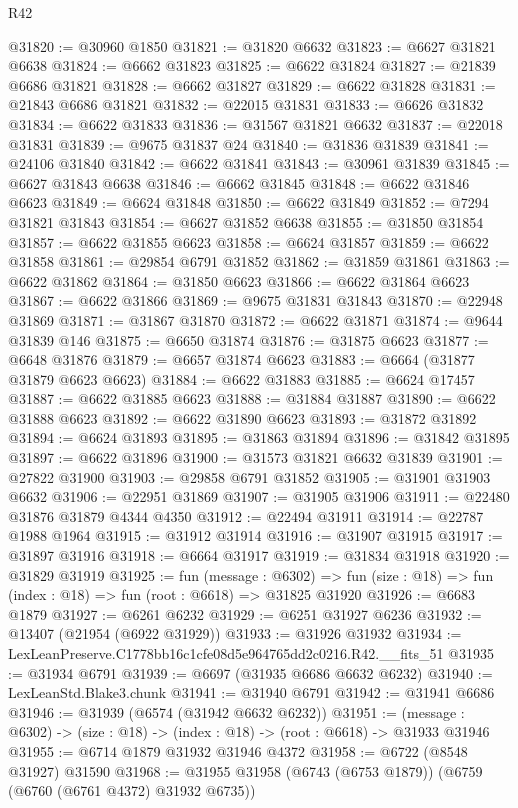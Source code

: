 \begin{lexlean}{R42}
\begin{coremodule}
{@31820 := @30960 @1850
@31821 := @31820 @6632
@31823 := @6627 @31821 @6638
@31824 := @6662 @31823
@31825 := @6622 @31824
@31827 := @21839 @6686 @31821
@31828 := @6662 @31827
@31829 := @6622 @31828
@31831 := @21843 @6686 @31821
@31832 := @22015 @31831
@31833 := @6626 @31832
@31834 := @6622 @31833
@31836 := @31567 @31821 @6632
@31837 := @22018 @31831
@31839 := @9675 @31837 @24
@31840 := @31836 @31839
@31841 := @24106 @31840
@31842 := @6622 @31841
@31843 := @30961 @31839
@31845 := @6627 @31843 @6638
@31846 := @6662 @31845
@31848 := @6622 @31846 @6623
@31849 := @6624 @31848
@31850 := @6622 @31849
@31852 := @7294 @31821 @31843
@31854 := @6627 @31852 @6638
@31855 := @31850 @31854
@31857 := @6622 @31855 @6623
@31858 := @6624 @31857
@31859 := @6622 @31858
@31861 := @29854 @6791 @31852
@31862 := @31859 @31861
@31863 := @6622 @31862
@31864 := @31850 @6623
@31866 := @6622 @31864 @6623
@31867 := @6622 @31866
@31869 := @9675 @31831 @31843
@31870 := @22948 @31869
@31871 := @31867 @31870
@31872 := @6622 @31871
@31874 := @9644 @31839 @146
@31875 := @6650 @31874
@31876 := @31875 @6623
@31877 := @6648 @31876
@31879 := @6657 @31874 @6623
@31883 := @6664 (@31877 @31879 @6623 @6623)
@31884 := @6622 @31883
@31885 := @6624 @17457
@31887 := @6622 @31885 @6623
@31888 := @31884 @31887
@31890 := @6622 @31888 @6623
@31892 := @6622 @31890 @6623
@31893 := @31872 @31892
@31894 := @6624 @31893
@31895 := @31863 @31894
@31896 := @31842 @31895
@31897 := @6622 @31896
@31900 := @31573 @31821 @6632 @31839
@31901 := @27822 @31900
@31903 := @29858 @6791 @31852
@31905 := @31901 @31903 @6632
@31906 := @22951 @31869
@31907 := @31905 @31906
@31911 := @22480 @31876 @31879 @4344 @4350
@31912 := @22494 @31911
@31914 := @22787 @1988 @1964
@31915 := @31912 @31914
@31916 := @31907 @31915
@31917 := @31897 @31916
@31918 := @6664 @31917
@31919 := @31834 @31918
@31920 := @31829 @31919
@31925 := fun (message : @6302) =>
  fun (size : @18) => fun (index : @18) => fun (root : @6618) => @31825 @31920
@31926 := @6683 @1879
@31927 := @6261 @6232
@31929 := @6251 @31927 @6236
@31932 := @13407 (@21954 (@6922 @31929))
@31933 := @31926 @31932
@31934 := LexLeanPreserve.C1778bb16c1cfe08d5e964765dd2c0216.R42.__fits_51
@31935 := @31934 @6791
@31939 := @6697 (@31935 @6686 @6632 @6232)
@31940 := LexLeanStd.Blake3.chunk
@31941 := @31940 @6791
@31942 := @31941 @6686
@31946 := @31939 (@6574 (@31942 @6632 @6232))
@31951 := (message : @6302) -> (size : @18) -> (index : @18) -> (root : @6618) -> @31933 @31946
@31955 := @6714 @1879 @31932 @31946 @4372
@31958 := @6722 (@8548 @31927) @31590
@31968 := @31955 @31958 (@6743 (@6753 @1879)) (@6759 (@6760 (@6761 @4372) @31932 @6735))
}
\end{coremodule}
\end{lexlean}
